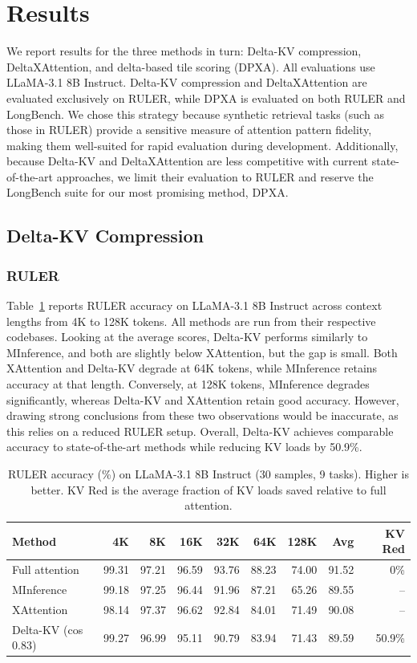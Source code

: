 \section{Results}

We report results for the three methods in turn: Delta-KV compression, DeltaXAttention, and delta-based tile scoring (DPXA). All evaluations use LLaMA-3.1 8B Instruct. Delta-KV compression and DeltaXAttention are evaluated exclusively on RULER, while DPXA is evaluated on both RULER and LongBench. We chose this strategy because synthetic retrieval tasks (such as those in RULER) provide a sensitive measure of attention pattern fidelity, making them well-suited for rapid evaluation during development. Additionally, because Delta-KV and DeltaXAttention are less competitive with current state-of-the-art approaches, we limit their evaluation to RULER and reserve the LongBench suite for our most promising method, DPXA.

\subsection{Delta-KV Compression}

\subsubsection{RULER}

Table~\ref{tab:ruler} reports RULER accuracy on LLaMA-3.1 8B Instruct across context lengths from 4K to 128K tokens. All methods are run from their respective codebases. Looking at the average scores, Delta-KV performs similarly to MInference, and both are slightly below XAttention, but the gap is small. Both XAttention and Delta-KV degrade at 64K tokens, while MInference retains accuracy at that length. Conversely, at 128K tokens, MInference degrades significantly, whereas Delta-KV and XAttention retain good accuracy. However, drawing strong conclusions from these two observations would be inaccurate, as this relies on a reduced RULER setup. Overall, Delta-KV achieves comparable accuracy to state-of-the-art methods while reducing KV loads by 50.9\%.

\begin{table}[!ht]
\centering
\caption{RULER accuracy (\%) on LLaMA-3.1 8B Instruct (30 samples, 9 tasks). Higher is better. KV Red is the average fraction of KV loads saved relative to full attention.}
\label{tab:ruler}
\begin{tabular}{lrrrrrrrr}
\toprule
Method & 4K & 8K & 16K & 32K & 64K & 128K & Avg & KV Red \\
\midrule
Full attention            & 99.31 & 97.21 & 96.59 & 93.76 & 88.23 & 74.00 & 91.52 & 0\%    \\
MInference                & 99.18 & 97.25 & 96.44 & 91.96 & 87.21 & 65.26 & 89.55 & --     \\
XAttention                & 98.14 & 97.37 & 96.62 & 92.84 & 84.01 & 71.49 & 90.08 & --     \\
Delta-KV (cos\,0.83)         & 99.27 & 96.99 & 95.11 & 90.79 & 83.94 & 71.43 & 89.59 & 50.9\% \\
\bottomrule
\end{tabular}
\end{table}

